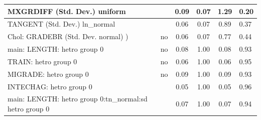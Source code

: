 \begin{table}
\begin{center}
\begin{tabular}{|l|l|c|c|c|l|}
			\hline
			MXGRDIFF (Std. Dev.) uniform &  & 0.09 & 0.07 & 1.29 & 0.20 \\
			\hline
			TANGENT (Std. Dev.) ln_normal &  & 0.06 & 0.07 & 0.89 & 0.37 \\
			\hline
			 Chol: GRADEBR (Std. Dev. normal) ) & no & 0.06 & 0.07 & 0.77 & 0.44 \\
			\hline
			main: LENGTH: hetro group 0 & no & 0.08 & 1.00 & 0.08 & 0.93 \\
			\hline
			TRAIN: hetro group 0 & no & 0.06 & 1.00 & 0.06 & 0.95 \\
			\hline
			MIGRADE: hetro group 0 & no & 0.09 & 1.00 & 0.09 & 0.93 \\
			\hline
			INTECHAG: hetro group 0 &  & 0.05 & 1.00 & 0.05 & 0.96 \\
			\hline
			main: LENGTH: hetro group 0:tn_normal:sd  hetro group 0 &  & 0.07 & 1.00 & 0.07 & 0.94 \\
			\hline
		\end{tabular}
	\end{center}
\end{table}